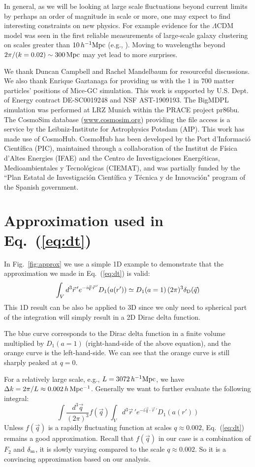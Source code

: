 \documentclass[prd,amsmath,amssymb,floatfix,superscriptaddress,nofootinbib,twocolumn]{revtex4-1}
\def\be{\begin{equation}}
\def\ee{\end{equation}}
\newcommand{\vrr}{\vec{r}}
\newcommand{\ec}[1]{Eq.~(\ref{eq:#1})}
\newcommand{\rf}[1]{\ref{fig:#1}}
\begin{document}
In general, as we will be looking at large scale fluctuations beyond current limits by perhaps an order of magnitude in scale or more, one may expect to find interesting constraints on new physics. For example evidence for the $\Lambda$CDM model was seen in the first reliable measurements of large-scale galaxy clustering on scales greater than $10\,h^{-1}\rm Mpc$ (e.g., \cite{Efstathio:1990cdm}). Moving to wavelengths beyond $2\pi/(k=0.02) \sim 300 \rm \, Mpc$ may yet lead to more surprises.

\acknowledgements
We thank Duncan Campbell and Rachel Mandelbaum for resourceful discussions. We also thank Enrique Gaztanaga for providing us with the $1$ in $700$ matter particles' positions of Mice-GC simulation. This work is supported by U.S. Dept. of Energy contract DE-SC0019248 and NSF AST-1909193.
The BigMDPL simulation was performed at LRZ Munich within the PRACE project pr86bu. The CosmoSim database (\url{www.cosmosim.org}) providing the file access is a service by the Leibniz-Institute for Astrophysics Potsdam (AIP).
This work has made use of CosmoHub. CosmoHub has been developed by the Port d'Informació Científica (PIC), maintained through a collaboration of the Institut de Física d'Altes Energies (IFAE) and the Centro de Investigaciones Energéticas, Medioambientales y Tecnológicas (CIEMAT), and was partially funded by the ``Plan Estatal de Investigación Científica y Técnica y de Innovación" program of the Spanish government.
\clearpage

\appendix 

\section{Approximation used in \ec{dt}}\label{appenda}
In Fig.~\rf{approx} we use a simple 1D example to demonstrate that the approximation we made in \ec{dt} is valid:
\be 
\int_{V} d^{3}\vrr\, 'e^{-i\vec{q}\cdot \vrr\, '}{D_{1}(a(r'))}  \simeq D_{1}(a=1)\,(2\pi)^3\delta_{\rm D}(\vec{q})
\ee 
This 1D result can be also be applied to 3D since we only need to spherical part of the integration will simply result in a 2D Dirac delta function.

The blue curve corresponds to the Dirac delta function in a finite volume multiplied by $D_{1}(a=1)$ (right-hand-side of the above equation), and the orange curve is the left-hand-side. We can see that the orange curve is still sharply peaked at $q=0$. 

For a relatively large scale, e.g., $L=3072\, h^{-1}\rm Mpc$, we have $\Delta k=2\pi/L\approx 0.002 \, h \, \rm Mpc^{-1}$. Generally we want to further evaluate the following integral:
\be
\int \frac{d^{3}\vec{q}}{(2\pi)^3}f(\vec{q}) \int_{V} d^{3}\vrr\, 'e^{-i\vec{q}\cdot \vrr\, '}{D_{1}(a(r'))}
\ee 
Unless $f(\vec{q})$ is a rapidly fluctuating function at scales $q \approx 0.002$, \ec{dt} remains a good approximation. Recall that $f(\vec{q})$ in our case is a combination of $F_{2}$ and $\delta_{\rm m}$, it is slowly varying compared to the scale $q \approx 0.002$. So it is a convincing approximation based on our analysis.
\end{document}
